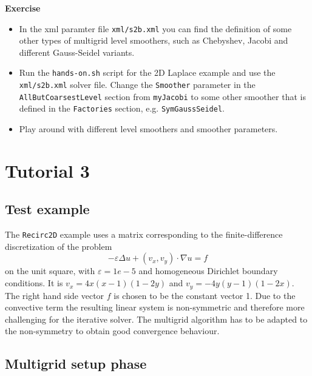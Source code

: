 \documentclass[12pt,a4paper]{article}
\begin{document}
\begin{graybox}
 \textbf{Exercise}
 \begin{itemize}
  \item In the xml paramter file \verb|xml/s2b.xml| you can find the definition of some other types of multigrid level smoothers, such as Chebyshev, Jacobi and different Gauss-Seidel variants.
  \item Run the \verb|hands-on.sh| script for the 2D Laplace example and use the \verb|xml/s2b.xml| solver file. Change the \verb|Smoother| parameter in the \verb|AllButCoarsestLevel| section from \verb|myJacobi| to some other smoother that is defined in the \verb|Factories| section, e.g. \verb|SymGaussSeidel|.
  \item Play around with different level smoothers and smoother parameters.
 \end{itemize}
\end{graybox}


\section{Tutorial 3}

\subsection{Test example}
The \texttt{Recirc2D} example uses a matrix corresponding to the finite-difference discretization of the problem
\begin{displaymath}
-\varepsilon\Delta u + (v_x,v_y)\cdot \nabla u=f
\end{displaymath}
on the unit square, with $\varepsilon=1e-5$ and homogeneous Dirichlet boundary conditions. It is $v_x=4x(x-1)(1-2y)$ and $v_y=-4y(y-1)(1-2x)$.
The right hand side vector $f$ is chosen to be the constant vector 1. Due to the convective term the resulting linear system is non-symmetric and therefore more challenging for the iterative solver. The multigrid algorithm has to be adapted to the non-symmetry to obtain good convergence behaviour.


\subsection{Multigrid setup phase}
\end{document}
